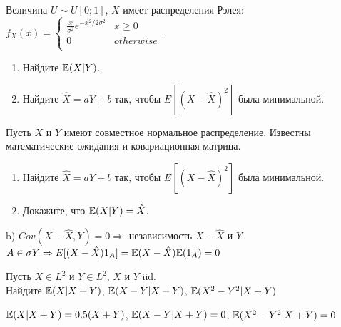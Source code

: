 \begin{problem}
Величина $U\sim U[0;1]$, $X$ имеет распределения Рэлея: \\
$f_{X}(x)=
\begin{cases}
  \frac{x}{\sigma^{2}}e^{-x^{2}/2\sigma^{2}} & x\ge 0 \\
  0 & otherwise \\
\end{cases}$.
\begin{enumerate}
\item Найдите $\mathbb{E}(X|Y)$.
\item Найдите $\hat{X}=aY+b$ так, чтобы $E[(X-\hat{X})^{2}]$ была
минимальной.
\end{enumerate}

\begin{sol}

\end{sol}
\end{problem}

\begin{problem}
Пусть $X$ и $Y$ имеют совместное нормальное распределение.
Известны математические ожидания и ковариационная матрица.
\begin{enumerate}
\item  Найдите $\hat{X}=aY+b$ так, чтобы $E[(X-\hat{X})^{2}]$ была
минимальной.
\item Докажите, что $\mathbb{E}(X|Y)=\hat{X}$.
\end{enumerate}

\begin{sol}


b) $Cov(X-\hat{X},Y)=0 \Rightarrow $ независимость $X-\hat{X}$ и
$Y$ \\
$A\in\sigma{Y} \Rightarrow
E[(X-\hat{X})1_{A}]=\mathbb{E}(X-\hat{X})\mathbb{E}(1_{A})=0$
\end{sol}
\end{problem}

\begin{problem}
Пусть $X\in L^{2}$ и $Y\in L^{2}$, $X$ и $Y$ iid. \\
Найдите $\mathbb{E}(X|X+Y)$, $\mathbb{E}(X-Y|X+Y)$, $\mathbb{E}(X^{2}-Y^{2}|X+Y)$

\begin{sol}

$\mathbb{E}(X|X+Y)=0.5(X+Y)$, $\mathbb{E}(X-Y|X+Y)=0$, $\mathbb{E}(X^{2}-Y^{2}|X+Y)=0$
\end{sol}
\end{problem}

